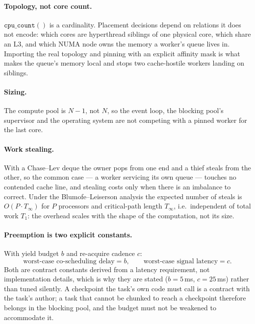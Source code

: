 \documentclass[11pt]{article}
\begin{document}
\paragraph{Topology, not core count.} $\mathtt{cpu\_count()}$ is a cardinality.
Placement decisions depend on relations it does not encode: which cores are
hyperthread siblings of one physical core, which share an L3, and which NUMA
node owns the memory a worker's queue lives in. Importing the real topology and
pinning with an explicit affinity mask is what makes the queue's memory local
and stops two cache-hostile workers landing on siblings.

\paragraph{Sizing.} The compute pool is $N-1$, not $N$, so the event loop, the
blocking pool's supervisor and the operating system are not competing with a
pinned worker for the last core.

\paragraph{Work stealing.} With a Chase--Lev deque the owner pops from one end
and a thief steals from the other, so the common case --- a worker servicing
its own queue --- touches no contended cache line, and stealing costs only when
there is an imbalance to correct. Under the Blumofe--Leiserson analysis the
expected number of steals is $O(P \cdot T_\infty)$ for $P$ processors and
critical-path length $T_\infty$, i.e.\ independent of total work $T_1$: the
overhead scales with the shape of the computation, not its size.

\paragraph{Preemption is two explicit constants.} With yield budget $b$ and
re-acquire cadence $c$:
\begin{equation}
\text{worst-case co-scheduling delay} = b, \qquad
\text{worst-case signal latency} = c .
\end{equation}
Both are contract constants derived from a latency requirement, not
implementation details, which is why they are stated ($b = 5$\,ms, $c =
25$\,ms) rather than tuned silently. A checkpoint the task's own code must call
is a contract with the task's author; a task that cannot be chunked to reach a
checkpoint therefore belongs in the blocking pool, and the budget must not be
weakened to accommodate it.
\end{document}

